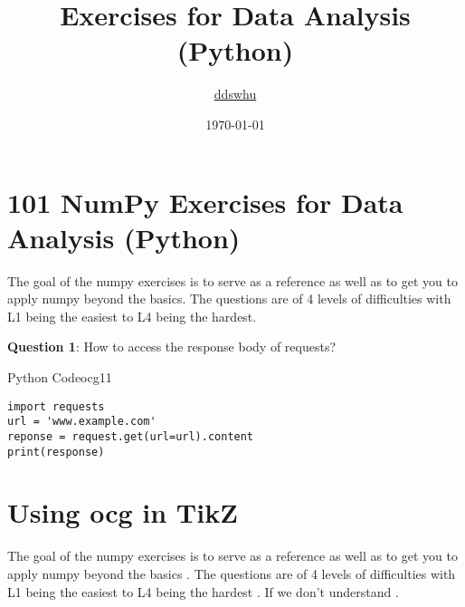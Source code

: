 \documentclass{article}
\title{Exercises for Data Analysis (Python)}
\author{\href{https://ddswhu.me/}{ddswhu}}
\date{\today}
\begin{document}
\maketitle


\section{101 NumPy Exercises for Data Analysis (Python)}


\indent The goal of the numpy exercises is to serve as a reference as well as to get you to apply numpy beyond the basics. The questions are of 4 levels of difficulties with L1 being the easiest to L4 being the hardest.

\noindent\textbf{Question 1}: How to access the response body of requests?\\

\begin{ocg}{Python Code}{ocg1}{1}
\begin{verbatim}
import requests
url = 'www.example.com'
reponse = request.get(url=url).content
print(response)
\end{verbatim}
\end{ocg}

\section{Using ocg in TikZ}

The goal of the numpy exercises is to serve as a reference as well as to get you to apply numpy beyond the basics . The questions are of 4 levels of difficulties with L1 being the easiest to L4 being the hardest  . If we don't understand .
\begin{figure}[!h]
\centering
{}
\end{figure}
\end{document}
